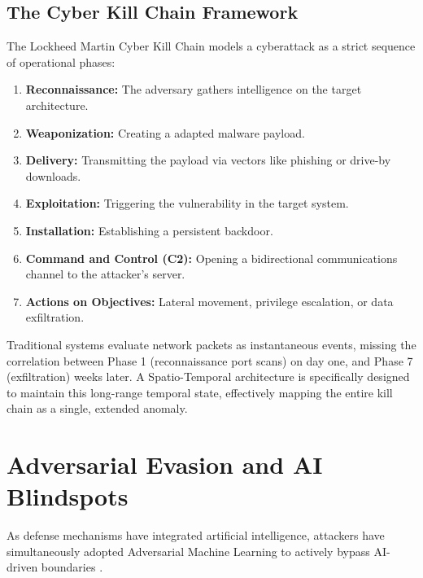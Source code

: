 \documentclass[12pt, a4paper]{report}
\begin{document}
\subsection{The Cyber Kill Chain Framework}
The Lockheed Martin Cyber Kill Chain \cite{hutchins2011intelligence} models a cyberattack as a strict sequence of operational phases:
\begin{enumerate}
    \item \textbf{Reconnaissance:} The adversary gathers intelligence on the target architecture.
    \item \textbf{Weaponization:} Creating a adapted malware payload.
    \item \textbf{Delivery:} Transmitting the payload via vectors like phishing or drive-by downloads.
    \item \textbf{Exploitation:} Triggering the vulnerability in the target system.
    \item \textbf{Installation:} Establishing a persistent backdoor.
    \item \textbf{Command and Control (C2):} Opening a bidirectional communications channel to the attacker's server.
    \item \textbf{Actions on Objectives:} Lateral movement, privilege escalation, or data exfiltration.
\end{enumerate}
Traditional systems evaluate network packets as instantaneous events, missing the correlation between Phase 1 (reconnaissance port scans) on day one, and Phase 7 (exfiltration) weeks later. A Spatio-Temporal architecture is specifically designed to maintain this long-range temporal state, effectively mapping the entire kill chain as a single, extended anomaly.

\section{Adversarial Evasion and AI Blindspots}
As defense mechanisms have integrated artificial intelligence, attackers have simultaneously adopted Adversarial Machine Learning to actively bypass AI-driven boundaries \cite{biggio2018wild}. 
\end{document}
